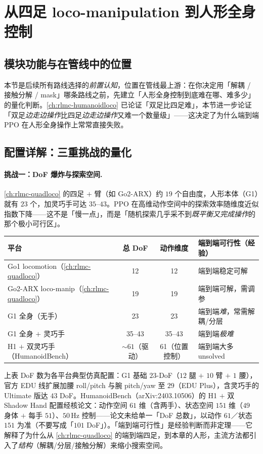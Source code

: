 \section{从四足 loco-manipulation 到人形全身控制}\label{sec:rlmc-wbc-challenge}

\subsection{模块功能与在管线中的位置}
本节是后续所有路线选择的\emph{前置认知}，位置在管线最上游：在你决定用「解耦 / 接触分解 / mask」哪条路线之前，先建立「人形全身控制到底难在哪、难多少」的量化判断。\cref{ch:rlmc-humanoidloco} 已论证「双足比四足难」，本节进一步论证「双足\emph{边走边操作}比四足\emph{边走边操作}又难一个数量级」——这决定了为什么端到端 PPO 在人形全身操作上常常直接失败。

\subsection{配置详解：三重挑战的量化}

\paragraph{挑战一：DoF 爆炸与探索空间.}
\cref{ch:rlmc-quadloco} 的四足 $+$ 臂（如 Go2-ARX）约 $19$ 个自由度，人形本体（G1）就有 $23$ 个，加灵巧手可达 $35$--$43$。PPO 在高维动作空间中的探索效率随维度近似指数下降——这不是「慢一点」，而是「随机探索几乎采不到\emph{既平衡又完成操作}的那个极小可行区」。

\begin{center}
\small
\begin{tabular}{lccl}
\hline
平台 & 总 DoF & 动作维度 & 端到端可行性（经验） \\
\hline
Go1 locomotion（\cref{ch:rlmc-quadloco}） & 12 & 12 & 端到端稳定可解 \\
Go2-ARX loco-manip（\cref{ch:rlmc-quadloco}） & 19 & 19 & 端到端可解，需调参 \\
G1 全身（无手） & 23 & 23 & 端到端\emph{难}，常需解耦/分层 \\
G1 全身 $+$ 灵巧手 & 35--43 & 35--43 & 端到端\emph{极难} \\
H1 $+$ 双灵巧手（HumanoidBench） & $\sim 61$（驱动） & 61（位置控制） & 端到端大多 unsolved \\
\hline
\end{tabular}
\end{center}

上表 DoF 数为各平台典型仿真配置：G1 基础 $23$-DoF（$12$ 腿 $+$ $10$ 臂 $+$ $1$ 腰），官方 EDU 线扩展加腰 roll/pitch 与腕 pitch/yaw 至 $29$（EDU Plus），含灵巧手的 Ultimate 版达 $43$ DoF。HumanoidBench（arXiv:2403.10506）的 H1 $+$ 双 Shadow Hand 配置经核论文：动作空间 $61$ 维（含两手）、状态空间 $151$ 维（$49$ 身体 $+$ 每手 $51$）、$50$\,Hz 控制——论文未给单一「DoF 总数」，以动作 $61$／状态 $151$ 为准（不要写成「$101$ DoF」）。「端到端可行性」是经验判断而非定理——它解释了为什么从 \cref{ch:rlmc-quadloco} 的端到端四足，到本章的人形，主流方法都引入了\emph{结构}（解耦/分层/接触分解）来缩小搜索空间。

